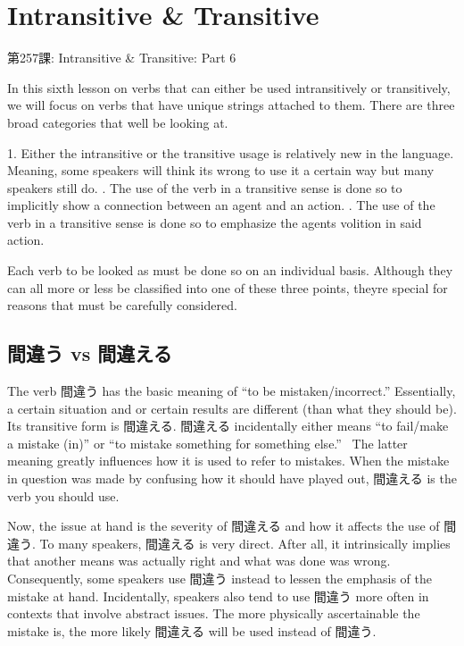     
\chapter{Intransitive \& Transitive}

\begin{center}
\begin{Large}
第257課: Intransitive \& Transitive: Part 6 
\end{Large}
\end{center}
 
\par{ In this sixth lesson on verbs that can either be used intransitively or transitively, we will focus on verbs that have unique strings attached to them. There are three broad categories that we\textquotesingle ll be looking at. }

\par{1. Either the intransitive or the transitive usage is relatively new in the language. Meaning, some speakers will think it\textquotesingle s wrong to use it a certain way but many speakers still do. \hfill{}. The use of the verb in a transitive sense is done so to implicitly show a connection between an agent and an action. \hfill{}. The use of the verb in a transitive sense is done so to emphasize the agent\textquotesingle s volition in said action. }

\par{ Each verb to be looked as must be done so on an individual basis. Although they can all more or less be classified into one of these three points, they\textquotesingle re special for reasons that must be carefully considered. }
      
\section{間違う vs 間違える}
 
\par{ The verb 間違う has the basic meaning of “to be mistaken\slash incorrect.” Essentially, a certain situation and or certain results are different (than what they should be). Its transitive form is 間違える. 間違える incidentally either means “to fail\slash make a mistake (in)” or “to mistake something for something else.”  The latter meaning greatly influences how it is used to refer to mistakes. When the mistake in question was made by confusing how it should have played out, 間違える is the verb you should use. }

\par{ Now, the issue at hand is the severity of 間違える and how it affects the use of 間違う. To many speakers, 間違える is very direct. After all, it intrinsically implies that another means was actually right and what was done was wrong. Consequently, some speakers use 間違う instead to lessen the emphasis of the mistake at hand. Incidentally, speakers also tend to use 間違う more often in contexts that involve abstract issues. The more physically ascertainable the mistake is, the more likely 間違える will be used instead of 間違う. }

